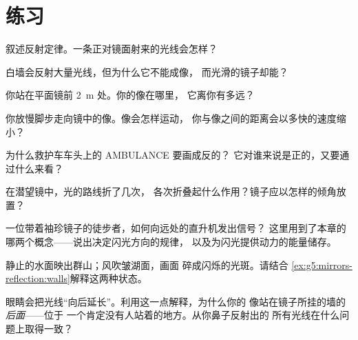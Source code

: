\section{练习}

\begin{exercise}[$\star$]\label{exo:g5:mirrors-reflection:1}
叙述反射定律。一条正对镜面射来的光线会怎样？
\end{exercise}

\begin{exercise}[$\star$]\label{exo:g5:mirrors-reflection:2}
白墙会反射大量光线，但为什么它不能成像，
而光滑的镜子却能？
\end{exercise}

\begin{exercise}[$\star$]\label{exo:g5:mirrors-reflection:3}
你站在平面镜前 \qty{2}{m} 处。你的像在哪里，
它离你有多远？
\end{exercise}

\begin{exercise}[$\star$]\label{exo:g5:mirrors-reflection:4}
你放慢脚步走向镜中的像。像会怎样运动，
你与像之间的距离会以多快的速度缩小？
\end{exercise}

\begin{exercise}[$\star$]\label{exo:g5:mirrors-reflection:5}
为什么救护车车头上的 AMBULANCE 要画成反的？
它对谁来说是正的，又要通过什么来看？
\end{exercise}

\begin{exercise}[$\star$]\label{exo:g5:mirrors-reflection:6}
在潜望镜中，光的路线折了几次，
各次折叠起什么作用？镜子应以怎样的倾角放置？
\end{exercise}

\begin{exercise}[$\star$]\label{exo:g5:mirrors-reflection:7}
一位带着袖珍镜子的徒步者，如何向远处的直升机发出信号？
这里用到了本章的哪两个概念——说出决定闪光方向的规律，
以及为闪光提供动力的能量储存。
\end{exercise}

\begin{exercise}[$\star$]\label{exo:g5:mirrors-reflection:8}
静止的水面映出群山；风吹皱湖面，画面
碎成闪烁的光斑。请结合
\cref{ex:g5:mirrors-reflection:walls}解释这两种状态。
\end{exercise}

\begin{exercise}[$\star\star$]\label{exo:g5:mirrors-reflection:9}
眼睛会把光线“向后延长”。利用这一点解释，为什么你的
像站在镜子所挂的墙的\emph{后面}——位于
一个肯定没有人站着的地方。从你鼻子反射出的
所有光线在什么问题上取得一致？
\end{exercise}

